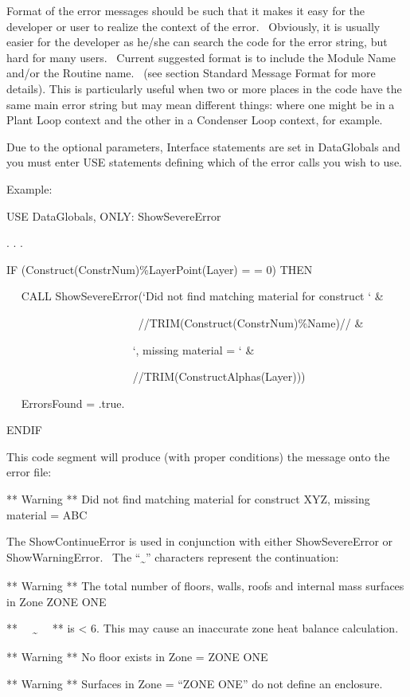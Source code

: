 Format of the error messages should be such that it makes it easy for the developer or user to realize the context of the error.~ Obviously, it is usually easier for the developer as he/she can search the code for the error string, but hard for many users.~ Current suggested format is to include the Module Name and/or the Routine name.~ (see section Standard Message Format for more details). This is particularly useful when two or more places in the code have the same main error string but may mean different things: where one might be in a Plant Loop context and the other in a Condenser Loop context, for example.

Due to the optional parameters, Interface statements are set in DataGlobals and you must enter USE statements defining which of the error calls you wish to use.

Example:

USE DataGlobals, ONLY: ShowSevereError

. . .

IF (Construct(ConstrNum)\%LayerPoint(Layer) = = 0) THEN

~~ CALL ShowSevereError(`Did not find matching material for construct ` \&

~~~~~~~~~~~~~~~~~~~~~~~ //TRIM(Construct(ConstrNum)\%Name)// \&

~~~~~~~~~~~~~~~~~~~~~~ `, missing material = ` \&

~~~~~~~~~~~~~~~~~~~~~~ //TRIM(ConstructAlphas(Layer)))

~~ ErrorsFound = .true.

ENDIF

This code segment will produce (with proper conditions) the message onto the error file:

** Warning ** Did not find matching material for construct XYZ, missing material = ABC

The ShowContinueError is used in conjunction with either ShowSevereError or ShowWarningError.~ The ``\textsubscript{\textasciitilde{}}'' characters represent the continuation:

** Warning ** The total number of floors, walls, roofs and internal mass surfaces in Zone ZONE ONE

**~~ \textsubscript{\textasciitilde{}}~~ ** is \textless{} 6. This may cause an inaccurate zone heat balance calculation.

** Warning ** No floor exists in Zone = ZONE ONE

** Warning ** Surfaces in Zone = ``ZONE ONE'' do not define an enclosure.

